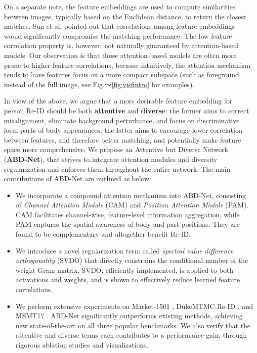 \documentclass[10pt,twocolumn]{article}
\begin{document}
On a separate note, the feature embeddings are used to compute similarities between images, typically based on the Euclidean distance, to return the closest matches. Sun et al. \cite{Sun_2017} pointed out that correlations among feature embeddings would significantly compromise the matching performance. The low feature correlation property is, however, not naturally guaranteed by attention-based models. Our observation is that those attention-based models are often more prone to higher feature correlations, because intuitively, the attention mechanism tends to have features focus on a more compact subspace (such as foreground instead of the full image, see Fig.～\ref{fig:visfintro} for examples). 

In view of the above, we argue that a more desirable feature embedding for person Re-ID should be both \textbf{attentive} and \textbf{diverse}: the former aims to correct misalignment, eliminate background perturbance, and focus on discriminative local parts of body appearances; the latter aims to encourage lower correlation between features, and therefore better matching, and potentially make feature space more comprehensive. We propose an Attentive but Diverse Network (\textbf{ABD-Net}), that strives to integrate attention modules and diversity regularization and enforces them throughout the entire network. The main contributions of ABD-Net are outlined as below:
\begin{itemize}
\vspace{-0.3em}
    \item We incorporate a compound attention mechanism into ABD-Net, consisting of \textit{Channel Attention Module} (CAM) and \textit{Position Attention Module} (PAM). CAM facilitates channel-wise, feature-level information aggregation, while PAM captures the spatial awareness of body and part positions. They are found to be complementary and altogether benefit Re-ID.\vspace{-0.5em}
    \item We introduce a novel regularization term called \textit{spectral value difference orthogonality} (SVDO) that directly constrains the conditional number of the weight Gram matrix. SVDO, efficiently implemented, is applied to both activations and weights, and is shown to effectively reduce learned feature correlations.\vspace{-0.5em}
    \item We perform extensive experiments on Market-1501 \cite{Zheng_2015_ICCV}, DukeMTMC-Re-ID \cite{Ristani_2016_ECCV}, and MSMT17 \cite{Wei_2018_CVPR}. ABD-Net significantly outperforms existing methods,  achieving new state-of-the-art on all three popular benchmarks. We also verify that the attentive and diverse terms each contributes to a performance gain, through rigorous ablation studies and visualizations.\vspace{-0.3em}
\end{itemize}
\end{document}
